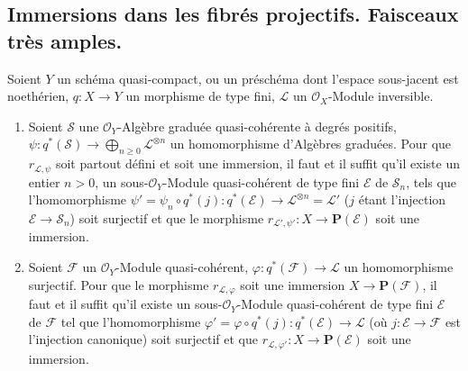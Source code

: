 \subsection{Immersions dans les fibrés projectifs. Faisceaux très amples.}
\label{subsection:II.4.4-fr}

\begin{proposition}[4.4.1]
\label{II.4.4.1-fr}
Soient $Y$ un schéma quasi-compact, ou un préschéma dont l'espace sous-jacent
est noethérien, $q:X\to Y$ un morphisme \textup{de type fini}, $\mathcal{L}$ un
$\mathcal{O}_X$-Module inversible.
\begin{enumerate}
  \item[\rm{(i)}] Soient $\mathcal{S}$ une $\mathcal{O}_Y$-Algèbre graduée
  quasi-cohérente à degrés positifs,
  $\psi:q^*(\mathcal{S})\to\bigoplus_{n\geq0}\mathcal{L}^{\otimes n}$ un
  homomorphisme d'Algèbres graduées. Pour que $r_{\mathcal{L},\psi}$ soit
  partout défini et soit une immersion, il faut et
  il suffit qu'il existe un entier $n>0$, un sous-$\mathcal{O}_Y$-Module
  quasi-cohérent \textup{de type fini} $\mathcal{E}$ de $\mathcal{S}_n$, tels que
  l'homomorphisme
  $\psi'=\psi_n\circ q^*(j):q^*(\mathcal{E})
  \to\mathcal{L}^{\otimes n}=\mathcal{L}'$
  ($j$ étant l'injection $\mathcal{E}\to\mathcal{S}_n$) soit surjectif et que
  le morphisme
  $r_{\mathcal{L}',\psi'}:X\to\mathbf{P}(\mathcal{E})$ soit une immersion.
  \item[\rm{(ii)}] Soient $\mathcal{F}$ un $\mathcal{O}_Y$-Module
  quasi-cohérent, $\varphi:q^*(\mathcal{F})\to\mathcal{L}$ un homomorphisme
  surjectif. Pour que le morphisme $r_{\mathcal{L},\varphi}$ soit une
  immersion $X\to\mathbf{P}(\mathcal{F})$, il faut et il suffit qu'il existe
  un sous-$\mathcal{O}_Y$-Module quasi-cohérent \textup{de type fini} $\mathcal{E}$ de
  $\mathcal{F}$ tel que l'homomorphisme
  $\varphi'=\varphi\circ q^*(j):q^*(\mathcal{E})\to\mathcal{L}$ (où
  $j:\mathcal{E}\to\mathcal{F}$ est l'injection canonique) soit surjectif et
  que $r_{\mathcal{L},\varphi'}:X\to\mathbf{P}(\mathcal{E})$ soit une
  immersion.
\end{enumerate}
\end{proposition}

